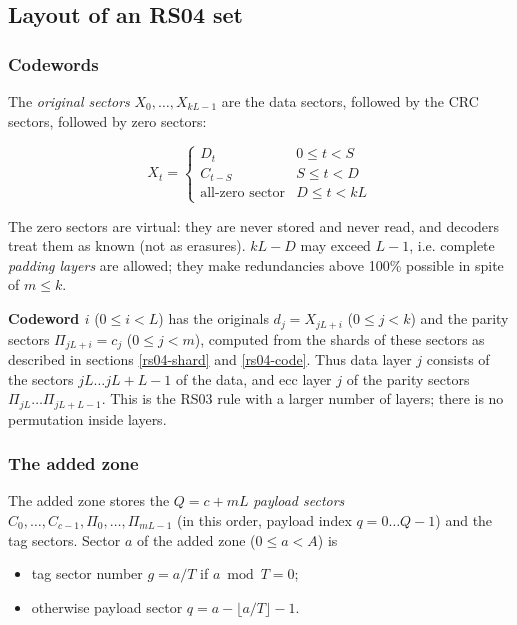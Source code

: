 \subsection{Layout of an RS04 set}
\label{rs04-layout}

\subsubsection{Codewords}

The {\em original sectors} $X_0, \ldots, X_{kL-1}$ are the data sectors,
followed by the CRC sectors, followed by zero sectors:

\[ X_t = \left\{ \begin{array}{ll}
  D_t & 0 \le t < S \\
  C_{t-S} & S \le t < D \\
  \mbox{all-zero sector} & D \le t < kL
  \end{array} \right. \]

The zero sectors are virtual: they are never stored and never read, and
decoders treat them as known (not as erasures). $kL - D$ may exceed $L-1$,
i.e. complete {\em padding layers} are allowed; they make redundancies above
100\% possible in spite of $m \le k$.

\medskip

{\bf Codeword $i$} ($0 \le i < L$) has the originals
$d_j = X_{jL+i}$ ($0 \le j < k$) and the parity sectors
$\Pi_{jL+i} = c_j$ ($0 \le j < m$), computed from the shards of these
sectors as described in sections \ref{rs04-shard} and \ref{rs04-code}.
Thus data layer $j$ consists of the sectors $jL \ldots jL+L-1$ of the data,
and ecc layer $j$ of the parity sectors $\Pi_{jL} \ldots \Pi_{jL+L-1}$.
This is the RS03 rule with a larger number of layers; there is no
permutation inside layers.

\subsubsection{The added zone}
\label{rs04-zone}

The added zone stores the $Q = c + mL$ {\em payload sectors}
$C_0, \ldots, C_{c-1}, \Pi_0, \ldots, \Pi_{mL-1}$ (in this order, payload
index $q = 0 \ldots Q-1$) and the tag sectors. Sector $a$ of the added zone
($0 \le a < A$) is

\begin{itemize}
\item tag sector number $g = a / T$ if $a \bmod T = 0$;
\item otherwise payload sector $q = a - \lfloor a/T \rfloor - 1$.
\end{itemize}

